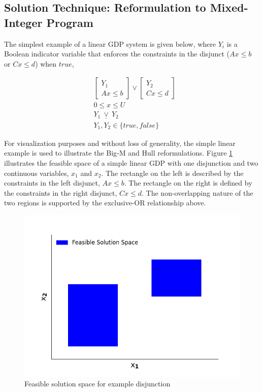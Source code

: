 \documentclass{juliacon}
\begin{document}
\subsection{Solution Technique: Reformulation to Mixed-Integer Program}
The simplest example of a linear GDP system is given below, where $Y_i$ is a Boolean indicator variable that enforces the constraints in the disjunct ($Ax \le b$ or $Cx \le d$) when $true$,

\begin{align*}
    & \begin{bmatrix}
    Y_1 \\ Ax \leq b
    \end{bmatrix}
    \lor
    \begin{bmatrix}
        Y_2 \\ Cx \leq d
    \end{bmatrix} \\
    & 0 \leq x \leq U \\
    & Y_1 \ \underline{\vee} \ Y_2 \\
    & Y_1, Y_2 \in \{true, false\}
\end{align*}

For visualization purposes and without loss of generality, the simple linear example is used to illustrate the Big-M and Hull reformulations. Figure \ref{fig:reform_figure} illustrates the feasible space of a simple linear GDP with one disjunction and two continuous variables, $x_1$ and $x_2$. The rectangle on the left is described by the constraints in the left disjunct, $Ax \leq b$. The rectangle on the right is defined by the constraints in the right disjunct, $Cx \le d$. The non-overlapping nature of the two regions is supported by the exclusive-OR relationship above.

\begin{figure}
    \centering
    \includegraphics[scale=0.5]{solnspace.png}
    \caption{Feasible solution space for example disjunction}
    \label{fig:reform_figure}
\end{figure}
\end{document}
